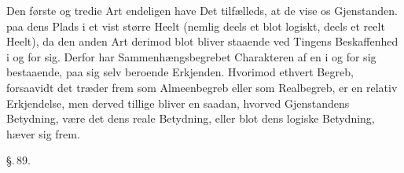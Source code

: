 \documentclass[12pt]{book}
\def\textit#1{#1}%
\def\emph#1{#1}%
\newcommand{\parag}[1]{%
  \par\vspace{0.9\baselineskip}%
  {\centering\textit{\S.\,#1.}\par}%
  \vspace{0.35\baselineskip}%
  \noindent\hspace{\parindent}\ignorespaces
}
\begin{document}
Den første og tredie Art endeligen have Det tilfælleds, at de vise os Gjenstanden. paa
dens \emph{Plads} i et vist større Heelt (nemlig deels et blot logiskt, deels et reelt
Heelt), da den anden Art derimod blot bliver staaende ved Tingens Beskaffenhed i og for
sig. Derfor har Sammenhængsbegrebet Charakteren af en i og for sig bestaaende, paa sig
selv beroende Erkjenden. Hvorimod ethvert Begreb, forsaavidt det træder frem som
Almeenbegreb eller som Realbegreb, er en relativ Erkjendelse, men derved tillige bliver
en saadan, hvorved Gjenstandens Betydning, være det dens \emph{reale} Betydning, eller
blot dens \emph{logiske} Betydning, hæver sig frem.

\parag{89}
\end{document}
